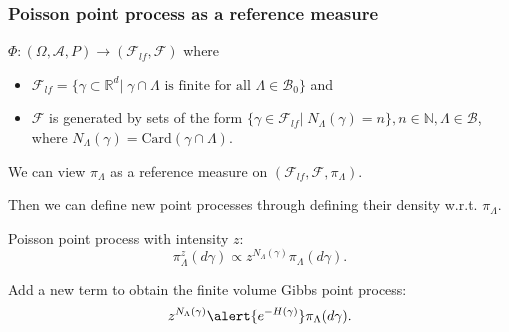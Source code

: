 \documentclass[c, 10pt]{beamer}
\begin{document}
\begin{frame}\frametitle{Poisson point process as a reference measure}
$\Phi: (\Omega, \mathcal A, P) \to (\mathcal F_{lf}, \mathscr F)$ where 
\begin{itemize}
\item $\mathcal F_{lf} = \{ \gamma \subset \mathbb R^d | \; \gamma \cap \Lambda \text{ is finite for all } \Lambda \in \mathcal B_0\}$ and 
\item $\mathscr F$ is generated by sets of the form $\{\gamma \in \mathcal F_{lf} | \; N_\Lambda(\gamma) = n \}, n \in \mathbb N, \Lambda \in \mathcal B$, where $N_\Lambda(\gamma) = \text{Card}(\gamma \cap \Lambda)$.
\end{itemize}
\vspace{3mm}

We can view $\pi_\Lambda$ as a reference measure on $(\mathcal F_{lf}, \mathscr F, \pi_\Lambda)$.

Then we can define new point processes through defining their density w.r.t. $\pi_\Lambda$.

\vspace{2mm}
Poisson point process with intensity $z$:
$$ \pi^z_\Lambda (d\gamma) \propto z^{N_\Lambda(\gamma)} \pi_\Lambda(d\gamma).$$

Add a new term to obtain the finite volume Gibbs point process:
$$ z^{N_\Lambda(\gamma)} \alert{ e^{- H(\gamma)} } \pi_\Lambda(d\gamma)  .$$

\end{frame}
\end{document}
